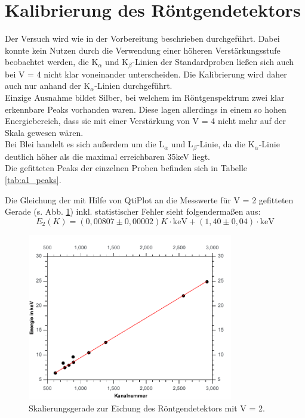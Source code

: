 \section{Kalibrierung des Röntgendetektors}

Der Versuch wird wie in der Vorbereitung beschrieben durchgeführt.
Dabei konnte kein Nutzen durch die Verwendung einer höheren Verstärkungsstufe beobachtet werden, die K$_\alpha$ und K$_\beta$-Linien der Standardproben ließen sich auch bei V = 4 nicht klar voneinander unterscheiden. Die Kalibrierung wird daher auch nur anhand der K$_\alpha$-Linien durchgeführt.\\
Einzige Ausnahme bildet Silber, bei welchem im Röntgenspektrum zwei klar erkennbare Peaks vorhanden waren. Diese lagen allerdings in einem so hohen Energiebereich, dass sie mit einer Verstärkung von V = 4 nicht mehr auf der Skala gewesen wären.\\
Bei Blei handelt es sich außerdem um die L$_\alpha$ und L$_\beta$-Linie, da die K$_\alpha$-Linie deutlich höher als die maximal erreichbaren 35\;keV liegt.\\
Die gefitteten Peaks der einzelnen Proben befinden sich in Tabelle \ref{tab:a1_peaks}.


Die Gleichung der mit Hilfe von QtiPlot an die Messwerte f\"ur V = 2 gefitteten Gerade (s. Abb. \ref{fig:a1_fit}) inkl. statistischer Fehler sieht folgendermaßen aus:
\begin{equation}
	E_2(K) = (0,00807\pm 0,00002)K\cdot\si{\kilo\electronvolt} + (1,40\pm 0,04)\cdot\si{\kilo\electronvolt}
\end{equation}

\begin{figure}[h]
	\centering\includegraphics[width=0.8\textwidth]{fig/a1_fit}
	\caption{Skalierungsgerade zur Eichung des Röntgendetektors mit V = 2.}
	\label{fig:a1_fit}
\end{figure}

